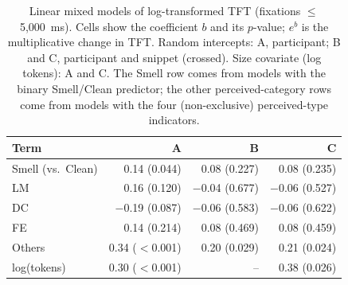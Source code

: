 \begin{table}[!htbp]
\caption{Linear mixed models of log-transformed TFT (fixations $\leq$ 5,000~ms). Cells show the coefficient $b$ and its $p$-value; $e^{b}$ is the multiplicative change in TFT. Random intercepts: A, participant; B and C, participant and snippet (crossed). Size covariate (log tokens): A and C. The Smell row comes from models with the binary Smell/Clean predictor; the other perceived-category rows come from models with the four (non-exclusive) perceived-type indicators.}
\label{tab:rq2_lmm}
\centering\footnotesize
\setlength{\tabcolsep}{4pt}
\begin{tabular}{@{}lrrr@{}}
\toprule
Term & A & B & C \\
\midrule
Smell (vs.\ Clean) & 0.14 (0.044) & 0.08 (0.227) & 0.08 (0.235) \\
LM & 0.16 (0.120) & $-$0.04 (0.677) & $-$0.06 (0.527) \\
DC & $-$0.19 (0.087) & $-$0.06 (0.583) & $-$0.06 (0.622) \\
FE & 0.14 (0.214) & 0.08 (0.469) & 0.08 (0.459) \\
Others & 0.34 ($<$0.001) & 0.20 (0.029) & 0.21 (0.024) \\
log(tokens) & 0.30 ($<$0.001) & -- & 0.38 (0.026) \\
\bottomrule
\end{tabular}
\end{table}
